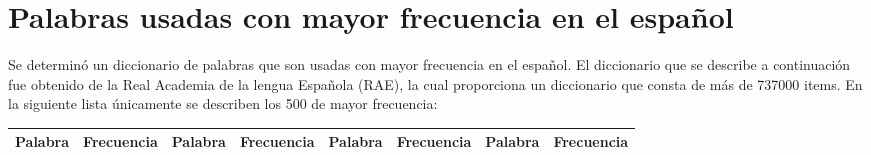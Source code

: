 \section{Palabras usadas con mayor frecuencia en el espa\~nol}

Se determin\'o un diccionario de palabras que son usadas con mayor frecuencia en el espa\~nol. El diccionario que se describe a continuaci\'on fue obtenido de la Real Academia de la lengua Espa\~nola (RAE), la cual proporciona un diccionario que consta de m\'as de 737000 items. En la siguiente lista \'unicamente se describen los 500 de mayor frecuencia\cite{RAE}:


\begin{table}

\begin{tabular}{|l|l|l|l|l|l|l|l|}


\hline

Palabra & Frecuencia & Palabra & Frecuencia & Palabra & Frecuencia & Palabra & Frecuencia  \\

	\hline


\end{tabular}
\end{table}
